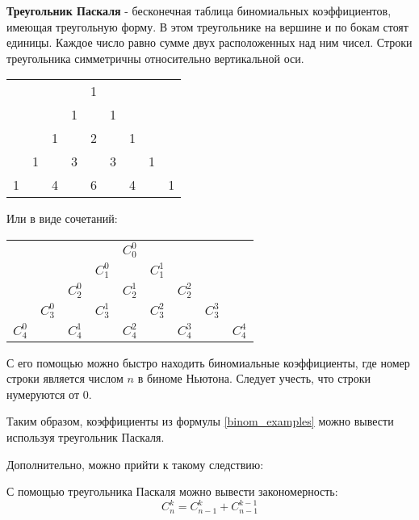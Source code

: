 \begin{utv}
    \textbf{Треугольник Паскаля} - бесконечная таблица биномиальных коэффициентов, 
    имеющая треугольную форму. В этом треугольнике на вершине и по бокам стоят единицы. 
    Каждое число равно сумме двух расположенных над ним чисел. Строки треугольника симметричны 
    относительно вертикальной оси.

    \begin{table}[h]
        \centering
        \begin{tabular}[c]{ l l l l l l l l l}
             &  &  &  & 1 &  &  &  &  \\
             &  &  & 1 &  & 1 &  &  &  \\
             &  & 1 &  & 2 &  & 1 &  &  \\
             & 1 &  & 3 &  & 3 &  & 1 &  \\
            1 &  & 4 &  & 6 &  & 4 &  & 1
        \end{tabular}
    \end{table}
    
    Или в виде сочетаний:
    \begin{table}[h]
        \centering
        \begin{tabular}[c]{ l l l l l l l l l}
             &  &  &  & $C^0_0$ &  &  &  &  \\
             &  &  & $C^0_1$ &  & $C^1_1$ &  &  &  \\
             &  & $C^0_2$ &  & $C^1_2$ &  & $C^2_2$ &  &  \\
             & $C^0_3$ &  & $C^1_3$ &  & $C^2_3$ &  & $C^3_3$ &  \\
             $C^0_4$ &  & $C^1_4$ &  & $C^2_4$ &  & $C^3_4$ &  & $C^4_4$
        \end{tabular}
    \end{table}
    
\end{utv}

С его помощью можно быстро находить биномиальные коэффициенты, где номер строки является
числом $n$ в биноме Ньютона. Следует учесть, что строки нумеруются от 0.

Таким образом, коэффициенты из формулы \ref{binom_examples} можно вывести используя треугольник Паскаля.

Дополнительно, можно прийти к такому следствию:
\begin{sle}
    С помощью треугольника Паскаля можно вывести закономерность:
    \begin{equation}
        C^k_n = C^k_{n-1} + C^{k-1}_{n-1}
    \end{equation}
\end{sle}

